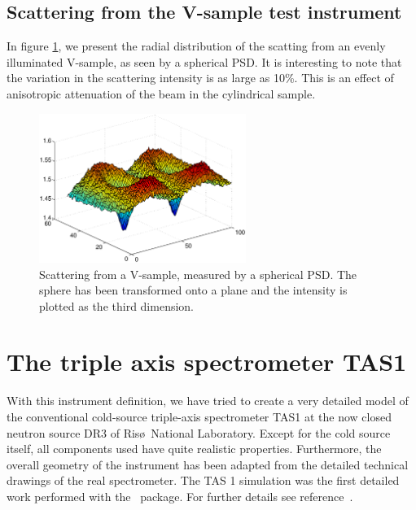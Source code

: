 \subsection{Scattering from the V-sample test instrument}
\label{s:vanadium-result}

In figure \ref{f:V-results}, we present the radial distribution 
of the scatting from an evenly illuminated V-sample,
as seen by a spherical PSD.
It is interesting to note that the variation in the
scattering intensity is as large as 10\%. This is an effect
of anisotropic attenuation of the beam in the cylindrical sample.

\begin{figure}
  \begin{center}
    \includegraphics[width=0.6\textwidth]{figures/vanadium-surf-2.eps}
  \end{center}
\caption{Scattering from a V-sample, measured by a spherical
  PSD. The sphere has been transformed onto a plane and the intensity is
  plotted as the third dimension. }
\label{f:V-results}
\end{figure}



\section{The triple axis spectrometer TAS1}
\label{s:TAS1}
With this instrument definition, we have tried to create
a very detailed model of the conventional cold-source
triple-axis spectrometer TAS1 at the now closed neutron source DR3 of
Ris\o\ National Laboratory. 
Except for the cold source itself, all components 
used have quite realistic properties. Furthermore, the overall
geometry of the instrument has been adapted from
the detailed technical drawings of the real spectrometer.
The TAS 1 simulation was the first detailed work
performed with the \MCS\ package. 
For further details see reference~\cite{tas1_report}.

